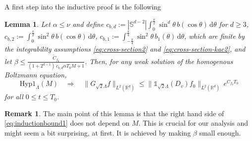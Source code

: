 \documentclass[11pt,a4paper,reqno]{amsart}
\theoremstyle{plain}
\newtheorem{lemma}[proposition]{Lemma}
\theoremstyle{definition}
\newtheorem{remark}[proposition]{Remark}
\begin{document}
A first step into the inductive proof is the following
\begin{lemma}\label{lem:induction1}
	Let $\alpha \leq \nu$ and define $c_{b,d}:= |{\mathbb{S}}^{d-2}| \int_{0}^{\tfrac{\pi}{2}} \sin^d\theta\, b(\cos\theta)\,\mathrm{d}\theta$ for $d\geq 3$, $c_{b,2}:= \int_{0}^{\tfrac{\pi}{2}} \sin^2\theta\, b(\cos\theta)\,\mathrm{d}\theta$, $c_{b,1}:= \int_{-\tfrac{\pi}{4}}^{\tfrac{\pi}{4}} \sin^2\theta\, b_1(\theta)\,\mathrm{d}\theta$, which are finite by the integrability assumptions \eqref{eq:cross-section2} and \eqref{eq:cross-section-kac2}, and let
	$\beta\le \frac{\tilde{C}_{f_0}}{(1+2^{d-1})\, c_{b,d}\alpha T_0 M +1}$. Then, for any weak solution of the homogenous Boltzmann equation,
	\begin{equation} \label{eq:inductionbound1}
		\mathrm{Hyp1}_{\Lambda}(M) \quad \Rightarrow \quad \|G_{\sqrt{2}\Lambda} f \|_{L^2({\mathbb{R}}^d)} \le \|{\mathds{1}}_{\sqrt{2}\Lambda}(D_v) f_0\|_{L^2({\mathbb{R}}^d)} \, e^{C_{f_0}T_0}
	\end{equation}
	for all $0\le t\le T_0$.
\end{lemma}

\begin{remark}
The main point of this lemma is that the right hand side of \eqref{eq:inductionbound1} does not depend on $M$. This is crucial for our analysis and might seem a bit surprising, at first. It is achieved by making $\beta$ small enough.
\end{remark}
\end{document}
